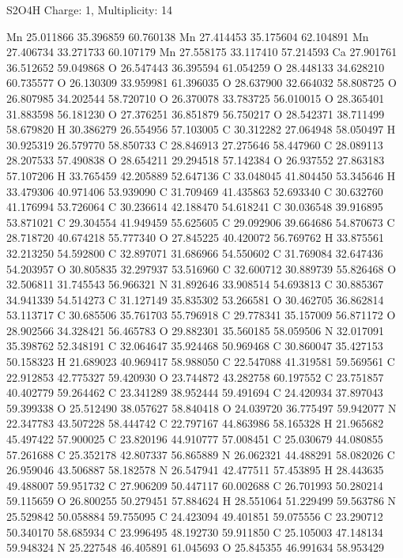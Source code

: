 \documentclass{article}
\begin{document}
S2O4H   Charge: 1, Multiplicity: 14    
   
Mn 25.011866 35.396859 60.760138
Mn 27.414453 35.175604 62.104891
Mn 27.406734 33.271733 60.107179
Mn 27.558175 33.117410 57.214593
Ca 27.901761 36.512652 59.049868
O 26.547443 36.395594 61.054259
O 28.448133 34.628210 60.735577
O 26.130309 33.959981 61.396035
O 28.637900 32.664032 58.808725
O 26.807985 34.202544 58.720710
O 26.370078 33.783725 56.010015
O 28.365401 31.883598 56.181230
O 27.376251 36.851879 56.750217
O 28.542371 38.711499 58.679820
H 30.386279 26.554956 57.103005
C 30.312282 27.064948 58.050497
H 30.925319 26.579770 58.850733
C 28.846913 27.275646 58.447960
C 28.089113 28.207533 57.490838
O 28.654211 29.294518 57.142384
O 26.937552 27.863183 57.107206
H 33.765459 42.205889 52.647136
C 33.048045 41.804450 53.345646
H 33.479306 40.971406 53.939090
C 31.709469 41.435863 52.693340
C 30.632760 41.176994 53.726064
C 30.236614 42.188470 54.618241
C 30.036548 39.916895 53.871021
C 29.304554 41.949459 55.625605
C 29.092906 39.664686 54.870673
C 28.718720 40.674218 55.777340
O 27.845225 40.420072 56.769762
H 33.875561 32.213250 54.592800
C 32.897071 31.686966 54.550602
C 31.769084 32.647436 54.203957
O 30.805835 32.297937 53.516960
C 32.600712 30.889739 55.826468
O 32.506811 31.745543 56.966321
N 31.892646 33.908514 54.693813
C 30.885367 34.941339 54.514273
C 31.127149 35.835302 53.266581
O 30.462705 36.862814 53.113717
C 30.685506 35.761703 55.796918
C 29.778341 35.157009 56.871172
O 28.902566 34.328421 56.465783
O 29.882301 35.560185 58.059506
N 32.017091 35.398762 52.348191
C 32.064647 35.924468 50.969468
C 30.860047 35.427153 50.158323
H 21.689023 40.969417 58.988050
C 22.547088 41.319581 59.569561
C 22.912853 42.775327 59.420930
O 23.744872 43.282758 60.197552
C 23.751857 40.402779 59.264462
C 23.341289 38.952444 59.491694
C 24.420934 37.897043 59.399338
O 25.512490 38.057627 58.840418
O 24.039720 36.775497 59.942077
N 22.347783 43.507228 58.444742
C 22.797167 44.863986 58.165328
H 21.965682 45.497422 57.900025
C 23.820196 44.910777 57.008451
C 25.030679 44.080855 57.261688
C 25.352178 42.807337 56.865889
N 26.062321 44.488291 58.082026
C 26.959046 43.506887 58.182578
N 26.547941 42.477511 57.453895
H 28.443635 49.488007 59.951732
C 27.906209 50.447117 60.002688
C 26.701993 50.280214 59.115659
O 26.800255 50.279451 57.884624
H 28.551064 51.229499 59.563786
N 25.529842 50.058884 59.755095
C 24.423094 49.401851 59.075556
C 23.290712 50.340170 58.685934
C 23.996495 48.192730 59.911850
C 25.105003 47.148134 59.948324
N 25.227548 46.405891 61.045693
O 25.845355 46.991634 58.953429
\end{document}
